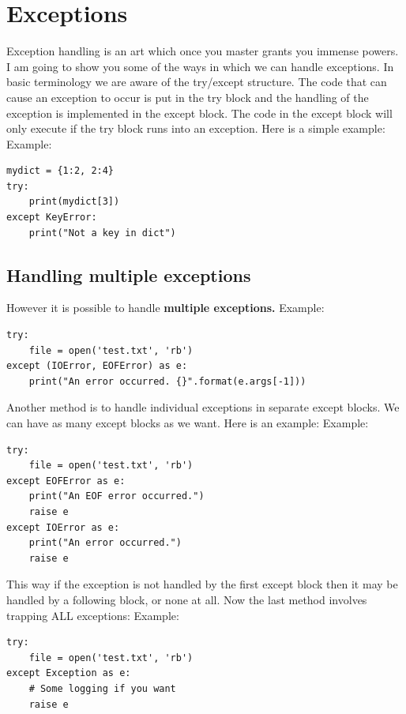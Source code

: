 \documentclass{report}
\begin{document}
    \pagebreak \bigbreak \noindent \section{Exceptions}
    \bigbreak \noindent
    Exception handling is an art which once you master grants you immense powers. I am going to show you some of the ways in which we can handle exceptions.
    \bigbreak \noindent 
    In basic terminology we are aware of the try/except structure. The code that can cause an exception to occur is put in the try block and the handling of the exception is implemented in the except block. The code in the except block will only execute if the try block runs into an exception. Here is a simple example:
    \bigbreak \noindent 
    Example:
    \begin{verbatim}
mydict = {1:2, 2:4}
try:
    print(mydict[3])
except KeyError:
    print("Not a key in dict")
    \end{verbatim}




    \subsection{Handling multiple exceptions}
    \bigbreak \noindent
    However it is possible to handle \textbf{multiple exceptions.}
    \bigbreak \noindent 
    Example:
    \begin{verbatim}
try:
    file = open('test.txt', 'rb')
except (IOError, EOFError) as e:
    print("An error occurred. {}".format(e.args[-1]))
    \end{verbatim}
    Another method is to handle individual exceptions in separate except blocks. We can have as many except blocks as we want. Here is an example:
    \bigbreak \noindent 
    Example:
    \begin{verbatim}
try:
    file = open('test.txt', 'rb')
except EOFError as e:
    print("An EOF error occurred.")
    raise e
except IOError as e:
    print("An error occurred.")
    raise e
    \end{verbatim}
    This way if the exception is not handled by the first except block then it may be handled by a following block, or none at all. Now the last method involves trapping ALL exceptions:
    \bigbreak \noindent 
    Example:
    \begin{verbatim}
try:
    file = open('test.txt', 'rb')
except Exception as e:
    # Some logging if you want
    raise e
    \end{verbatim}
    \bigbreak \noindent 
\end{document}
